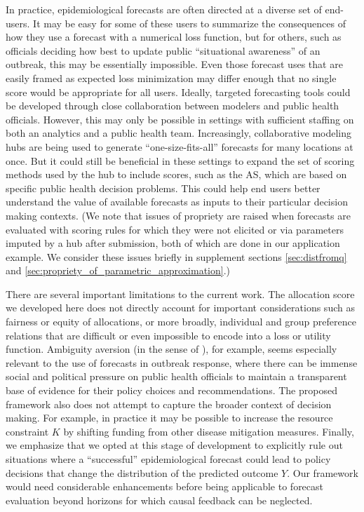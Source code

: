 \documentclass{article}\usepackage[]{graphicx}\usepackage[]{xcolor}
\begin{document}
In practice, epidemiological forecasts are often directed at a diverse set of end-users. It may be easy for some of these
users to summarize the consequences of how they use a forecast with a numerical loss function, but for others, such
as officials deciding how best to update public ``situational awareness'' of an outbreak, this may be essentially impossible.
Even those forecast uses that are easily framed as expected loss minimization 
may differ enough 
that no single score
would be appropriate for all users. Ideally, targeted forecasting tools could be developed through close collaboration
between modelers and public health officials. However, this may only be possible in settings with sufficient staffing on
both an analytics and a public health team. Increasingly, collaborative modeling hubs are being used to generate
``one-size-fits-all'' forecasts for many locations at once. But it could still be beneficial in these settings to expand
the set of scoring methods used by the hub to include scores, such as the AS, which are based on specific public health decision
problems.  This could help end users better understand the value of available forecasts as inputs to their particular
decision making contexts. (We note that issues of propriety are raised when forecasts are evaluated with scoring rules
for which they were not elicited or via parameters imputed by a hub after submission, both of which are done in our
application example.  We consider these issues briefly in supplement sections \ref{sec:distfromq} and
\ref{sec:propriety_of_parametric_approximation}.)

There are several important limitations to the current work. The allocation score we developed here does not directly
account for important considerations such as fairness or equity of allocations, or more broadly, individual and group
preference relations that are difficult or even impossible to encode into a loss or utility function.  Ambiguity aversion
(in the sense of \cite{ellsberg1961risk}), for example, seems especially relevant to the use of forecasts in outbreak
response, where there can be immense social and political pressure on public health officials to maintain a transparent
base of evidence for their policy choices and recommendations. The proposed framework also does not attempt to capture
the broader context of decision making. For example, in practice it may be possible to increase the resource constraint
$K$ by shifting funding from other disease mitigation measures. Finally, we emphasize that we opted at this stage of
development to explicitly rule out situations where a ``successful''
epidemiological forecast could lead to policy decisions that change the distribution of the predicted outcome $Y$. Our
framework would need considerable enhancements before being applicable to forecast evaluation beyond horizons for which
causal feedback can be neglected.
\end{document}
